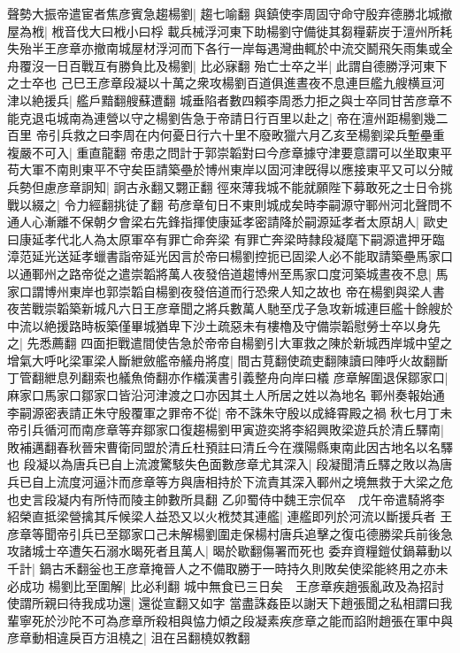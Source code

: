 聲勢大振帝遣宦者焦彦賓急趨楊劉|{
	趨七喻翻}
與鎮使李周固守命守殷弃德勝北城撤屋為栰|{
	栰音伐大曰栰小曰桴}
載兵械浮河東下助楊劉守備徙其芻糧薪炭于澶州所耗失殆半王彦章亦撤南城屋材浮河而下各行一岸每遇灣曲輒於中流交鬭飛矢雨集或全舟覆沒一日百戰互有勝負比及楊劉|{
	比必寐翻}
殆亡士卒之半|{
	此謂自德勝浮河東下之士卒也}
己巳王彦章段凝以十萬之衆攻楊劉百道俱進晝夜不息連巨艦九艘横亘河津以絶援兵|{
	艦戶黯翻艘蘇遭翻}
城垂陷者數四賴李周悉力拒之與士卒同甘苦彦章不能克退屯城南為連營以守之楊劉告急于帝請日行百里以赴之|{
	帝在澶州距楊劉幾二百里}
帝引兵救之曰李周在内何憂日行六十里不廢畋獵六月乙亥至楊劉梁兵塹壘重複嚴不可入|{
	重直龍翻}
帝患之問計于郭崇韜對曰今彦章據守津要意謂可以坐取東平苟大軍不南則東平不守矣臣請築壘於博州東岸以固河津旣得以應接東平又可以分賊兵勢但慮彦章詗知|{
	詗古永翻又翾正翻}
徑來薄我城不能就願陛下募敢死之士日令挑戰以綴之|{
	令力經翻挑徒了翻}
苟彦章旬日不東則城成矣時李嗣源守鄆州河北聲問不通人心漸離不保朝夕會梁右先鋒指揮使康延孝密請降於嗣源延孝者太原胡人|{
	歐史曰康延孝代北人為太原軍卒有罪亡命奔梁}
有罪亡奔梁時隸段凝麾下嗣源遣押牙臨漳范延光送延孝蠟書詣帝延光因言於帝曰楊劉控扼已固梁人必不能取請築壘馬家口以通鄆州之路帝從之遣崇韜將萬人夜發倍道趨博州至馬家口度河築城晝夜不息|{
	馬家口謂博州東岸也郭崇韜自楊劉夜發倍道而行恐衆人知之故也}
帝在楊劉與梁人書夜苦戰崇韜築新城凡六日王彦章聞之將兵數萬人馳至戊子急攻新城連巨艦十餘艘於中流以絶援路時板築僅畢城猶卑下沙土疏惡未有樓櫓及守備崇韜慰勞士卒以身先之|{
	先悉薦翻}
四面拒戰遣間使告急於帝帝自楊劉引大軍救之陳於新城西岸城中望之增氣大呼叱梁軍梁人斷紲斂艦帝艤舟將度|{
	間古莧翻使疏吏翻陳讀曰陣呼火故翻斷丁管翻紲息列翻索也艤魚倚翻亦作檥漢書引義整舟向岸曰檥}
彦章解圍退保鄒家口|{
	麻家口馬家口鄒家口皆沿河津渡之口亦因其土人所居之姓以為地名}
鄆州奏報始通李嗣源密表請正朱守殷覆軍之罪帝不從|{
	帝不誅朱守殷以成絳霄殿之禍}
秋七月丁未帝引兵循河而南彦章等弃鄒家口復趨楊劉甲寅遊奕將李紹興敗梁遊兵於清丘驛南|{
	敗補邁翻春秋晉宋曹衛同盟於清丘杜預註曰清丘今在濮陽縣東南此因古地名以名驛也}
段凝以為唐兵已自上流渡驚駭失色面數彦章尤其深入|{
	段凝聞清丘驛之敗以為唐兵已自上流度河逼汴而彦章等方與唐相持於下流責其深入鄆州之境無救于大梁之危也史言段凝内有所恃而陵主帥數所具翻}
乙卯蜀侍中魏王宗侃卒　戊午帝遣騎將李紹榮直抵梁營擒其斥候梁人益恐又以火栰焚其連艦|{
	連艦即列於河流以斷援兵者}
王彦章等聞帝引兵已至鄒家口己未解楊劉圍走保楊村唐兵追擊之復屯德勝梁兵前後急攻諸城士卒遭矢石溺水暍死者且萬人|{
	暍於歇翻傷署而死也}
委弃資糧鎧仗鍋幕動以千計|{
	鍋古禾翻釡也王彦章掩晉人之不備取勝于一時持久則敗矣使梁能終用之亦未必成功}
楊劉比至圍解|{
	比必利翻}
城中無食已三日矣　王彦章疾趙張亂政及為招討使謂所親曰待我成功還|{
	還從宣翻又如字}
當盡誅姦臣以謝天下趙張聞之私相謂曰我輩寧死於沙陀不可為彦章所殺相與恊力傾之段凝素疾彦章之能而諂附趙張在軍中與彦章動相違戾百方沮橈之|{
	沮在呂翻橈奴教翻}
